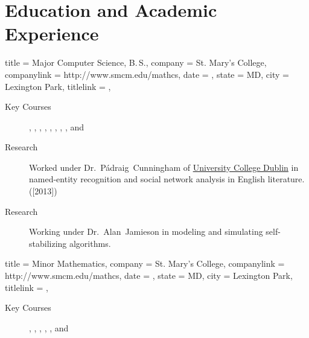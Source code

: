 \documentclass{bettercv}
\begin{document}
\section{Education and Academic Experience}
\begin{position}
  {
    title   = {Major \Dash Computer Science, B.\,S.},
    company = St. Mary's College,
    companylink = http://www.smcm.edu/mathcs,
    date    = ,
    state   = MD,
    city    = Lexington Park,
    titlelink = \transcript,
  }

\begin{description}
\item[Key Courses]
  ,
  ,
  ,
  ,
  ,
  ,
  ,
  ,
  and 
\item[Research] Worked under
  Dr.~P\'adraig~Cunningham of \href{http://www.ucd.ie}{University
    College Dublin} in named-entity recognition and social network
  analysis in English literature. ([2013])
\item[Research] Working under Dr.~Alan~Jamieson in modeling and
  simulating self-stabilizing algorithms.
\end{description}
\end{position}

\begin{position}
  {
    title   = Minor \Dash Mathematics,
    company = St. Mary's College,
    companylink = http://www.smcm.edu/mathcs,
    date    = ,
    state   = MD,
    city    = Lexington Park,
    titlelink = \transcript,
  }

  \begin{description}
  \item[Key Courses]
    ,
    ,
    ,
    ,
    ,
    and 
  \end{description}
\end{position}
\end{document}
